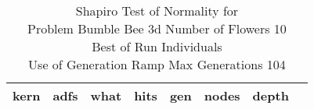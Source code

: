 \begin{table}[H]
\caption{Shapiro Test of Normality for \\ Problem  Bumble Bee 3d  Number of Flowers 10\\Best of Run Individuals \\ Use of Generation Ramp  Max Generations 104\\}
\begin{center}
\scalebox{0.8} %
{
\begin{tabular}{lrrrrrrr}
\hline
kern & adfs & what & hits & gen & nodes & depth \\
\hline


\end{tabular}
}
\end{center}
\end{table}

